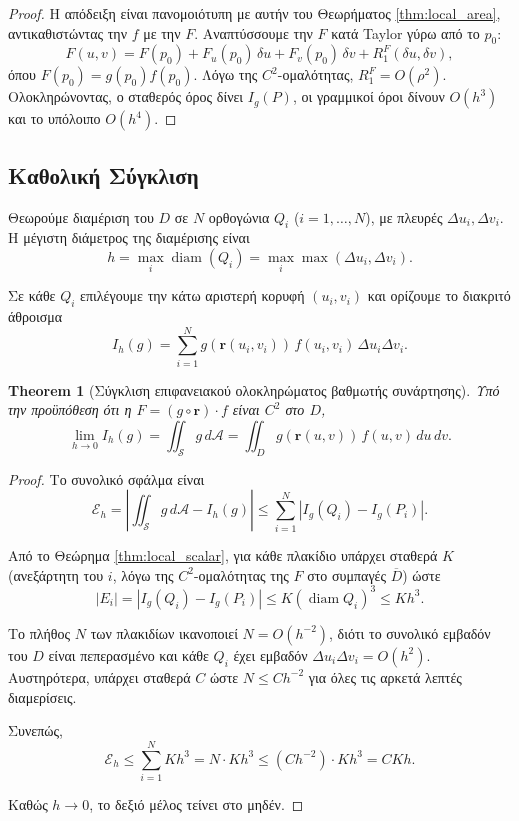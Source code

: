 \documentclass[10pt,a4paper,twoside,openany]{book}
\theoremstyle{plain}
\newtheorem{theorem}{Theorem}[section]
\theoremstyle{definition}
\theoremstyle{remark}
\numberwithin{equation}{section}
\begin{document}
\begin{proof}
Η απόδειξη είναι πανομοιότυπη με αυτήν του Θεωρήματος \ref{thm:local_area}, αντικαθιστώντας την \(f\) με την \(F\). Αναπτύσσουμε την \(F\) κατά Taylor γύρω από το \(p_0\):
\[
F(u,v) = F(p_0) + F_u(p_0)\,\delta u + F_v(p_0)\,\delta v + R_1^F(\delta u, \delta v),
\]
όπου \(F(p_0) = g(p_0) f(p_0)\). Λόγω της \(C^2\)-ομαλότητας, \(R_1^F = O(\rho^2)\). Ολοκληρώνοντας, ο σταθερός όρος δίνει \(I_g(P)\), οι γραμμικοί όροι δίνουν \(O(h^3)\) και το υπόλοιπο \(O(h^4)\).
\end{proof}

\subsection{Καθολική Σύγκλιση}

Θεωρούμε διαμέριση του \(D\) σε \(N\) ορθογώνια \(Q_i\) (\(i=1,\dots,N\)), με πλευρές \(\Delta u_i, \Delta v_i\). Η μέγιστη διάμετρος της διαμέρισης είναι
\[
h = \max_i \operatorname{diam}(Q_i) = \max_i \max(\Delta u_i, \Delta v_i).
\]

Σε κάθε \(Q_i\) επιλέγουμε την κάτω αριστερή κορυφή \((u_i, v_i)\) και ορίζουμε το διακριτό άθροισμα
\[
I_h(g) = \sum_{i=1}^N g(\mathbf{r}(u_i, v_i)) \, f(u_i, v_i) \, \Delta u_i \Delta v_i.
\]

\begin{theorem}[Σύγκλιση επιφανειακού ολοκληρώματος βαθμωτής συνάρτησης]
\label{thm:global_scalar}
Υπό την προϋπόθεση ότι η \(F = (g \circ \mathbf{r}) \cdot f\) είναι \(C^2\) στο \(D\),
\[
\lim_{h \to 0} I_h(g) = \iint_{\mathcal{S}} g \, d\mathcal{A} = \iint_D g(\mathbf{r}(u,v)) \, f(u,v) \, du \, dv.
\]
\end{theorem}

\begin{proof}
Το συνολικό σφάλμα είναι
\[
\mathcal{E}_h = \left| \iint_{\mathcal{S}} g \, d\mathcal{A} - I_h(g) \right| \le \sum_{i=1}^N \left| I_g(Q_i) - I_g(P_i) \right|.
\]

Από το Θεώρημα \ref{thm:local_scalar}, για κάθε πλακίδιο υπάρχει σταθερά \(K\) (ανεξάρτητη του \(i\), λόγω της \(C^2\)-ομαλότητας της \(F\) στο συμπαγές \(\overline{D}\)) ώστε
\[
|E_i| = |I_g(Q_i) - I_g(P_i)| \le K (\operatorname{diam} Q_i)^3 \le K h^3.
\]

Το πλήθος \(N\) των πλακιδίων ικανοποιεί \(N = O(h^{-2})\), διότι το συνολικό εμβαδόν του \(D\) είναι πεπερασμένο και κάθε \(Q_i\) έχει εμβαδόν \(\Delta u_i \Delta v_i = O(h^2)\). Αυστηρότερα, υπάρχει σταθερά \(C\) ώστε \(N \le C h^{-2}\) για όλες τις αρκετά λεπτές διαμερίσεις.

Συνεπώς,
\[
\mathcal{E}_h \le \sum_{i=1}^N K h^3 = N \cdot K h^3 \le (C h^{-2}) \cdot K h^3 = CK h.
\]

Καθώς \(h \to 0\), το δεξιό μέλος τείνει στο μηδέν.
\end{proof}
\end{document}
